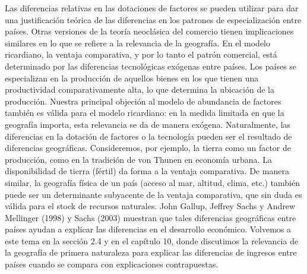 Las diferencias relativas en las dotaciones de factores se pueden utilizar para dar una justificación teórica de las diferencias en los patrones de especialización entre países. Otras versiones de la teoría neoclásica del comercio tienen implicaciones similares en lo que se refiere a la relevancia de la geografía. En el modelo ricardiano, la ventaja comparativa, y por lo tanto el patrón comercial, está determinado por las diferencias tecnológicas exógenas entre países. Los países se especializan en la producción de aquellos bienes en los que tienen una productividad comparativamente alta, lo que determina la ubicación de la producción. Nuestra principal objeción al modelo de abundancia de factores también es válida para el modelo ricardiano: en la medida limitada en que la geografía importa, esta relevancia se da de manera exógena. Naturalmente, las diferencias en la dotación de factores o la tecnología pueden ser el resultado de diferencias geográficas. Consideremos, por ejemplo, la tierra como un factor de producción, como en la tradición de von Thunen en economía urbana. La disponibilidad de tierra (fértil) da forma a la ventaja comparativa. De manera similar, la geografía física de un país (acceso al mar, altitud, clima, etc.) también puede ser un determinante subyacente de la ventaja comparativa, que sin duda es válida para el stock de recursos naturales. John Gallup, Jeffrey Sachs y Andrew Mellinger (1998) y Sachs (2003) muestran que tales diferencias geográficas entre países ayudan a explicar las diferencias en el desarrollo económico. Volvemos a este tema en la sección 2.4 y en el capítulo 10, donde discutimos la relevancia de la geografía de primera naturaleza para explicar las diferencias de ingresos entre países cuando se compara con explicaciones contrapuestas.
